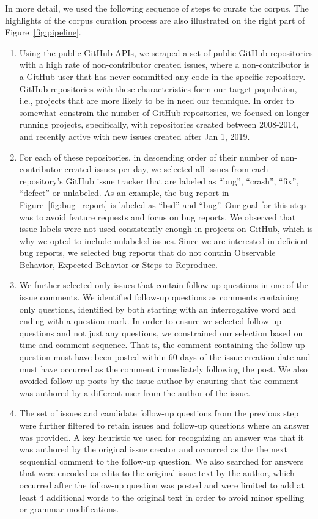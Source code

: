 In more detail, we used the following sequence of steps to curate the corpus. The highlights of the corpus curation process are also illustrated on the right part of Figure~\ref{fig:pipeline}.
\begin{enumerate}
\item Using the public GitHub APIs, we scraped a set of public GitHub repositories with a high rate of
non-contributor created issues, where a non-contributor is a GitHub user that has never
committed any code in the specific repository. GitHub repositories with these characteristics form
our target population, i.e., projects that are more likely to be in need our technique. In order
to somewhat constrain the number of GitHub repositories, we focused on longer-running projects,
specifically, with repositories created between 2008-2014, and recently active with new issues created after Jan 1, 2019.
\item For each of these repositories, in descending order of their number of non-contributor created issues per day,
we selected all issues from each repository's GitHub issue tracker that are labeled as ``bug'', ``crash'', ``fix'', ``defect'' or unlabeled. As an example, the bug report in Figure~\ref{fig:bug_report} is labeled as ``bsd'' and ``bug''.
Our goal for this step was to avoid feature requests and focus on bug reports. We observed that issue labels were not used consistently enough
in projects on GitHub, which is why we opted to include unlabeled issues. Since we are interested in deficient bug reports, we selected bug reports that do not contain Observable Behavior, Expected Behavior or Steps to Reproduce. 
\item We further selected only issues that contain follow-up questions in one of the issue comments.  We identified follow-up questions as  comments containing only questions, identified by both starting with an interrogative word and ending with a question mark. In order to ensure we selected follow-up questions and not just
any questions, we constrained our selection based on time and comment sequence. That is, the comment containing the follow-up question must have been posted within 60 days of the issue creation date and must have occurred as the comment immediately following the post. We also avoided follow-up posts by the issue author by ensuring that the comment was authored by a different user from the author of the issue.
\item The set of issues and candidate follow-up questions from the previous step were further filtered to
retain issues and follow-up questions where an answer was provided. A key heuristic we used for recognizing an answer was that it was authored
by the original issue creator and occurred as the the next sequential comment
to the follow-up question. We also searched for answers that were encoded as edits to the original issue text by the author, which occurred after the follow-up question was posted and were limited to add at least 4 additional words to the original text in order to avoid minor spelling or grammar modifications.
\end{enumerate}

